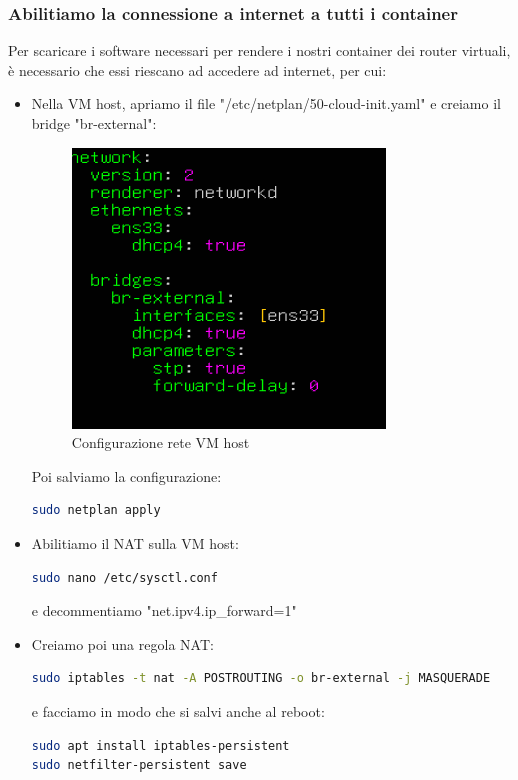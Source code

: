 \documentclass[12pt,a4paper,twoside]{book}
\begin{document}
\subsubsection{Abilitiamo la connessione a internet a tutti i container}
Per scaricare i software necessari per rendere i nostri container dei router virtuali, è necessario che essi riescano ad accedere ad internet, per cui:
\begin{itemize}
    \item Nella \ac{VM} host, apriamo il file "/etc/netplan/50-cloud-init.yaml" e creiamo il bridge "br-external":
    \begin{figure}[H]
        \centering
        \includegraphics[width=.6\linewidth]{tesi/img/cloud-init-yaml.png}
        \caption{Configurazione rete VM host}
        \label{fig:cloud-init-yaml}
    \end{figure}
    Poi salviamo la configurazione:
    \begin{lstlisting}[language=bash]
sudo netplan apply
    \end{lstlisting}
    \item Abilitiamo il NAT sulla \ac{VM} host:
    \begin{lstlisting}[language=bash]
sudo nano /etc/sysctl.conf
    \end{lstlisting}
    e decommentiamo "net.ipv4.ip\_forward=1"
    \item Creiamo poi una regola NAT:
    \begin{lstlisting}[language=bash]
sudo iptables -t nat -A POSTROUTING -o br-external -j MASQUERADE
    \end{lstlisting}
    e facciamo in modo che si salvi anche al reboot:
    \begin{lstlisting}[language=bash]
sudo apt install iptables-persistent
sudo netfilter-persistent save
    \end{lstlisting}

\end{itemize}
\end{document}
